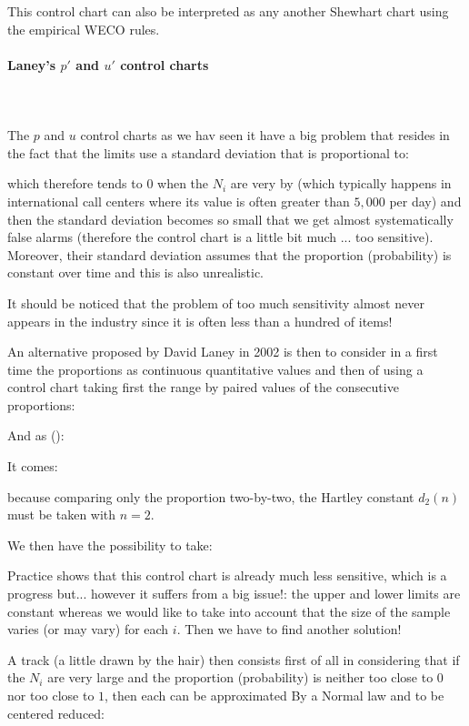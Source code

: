 	This control chart can also be interpreted as any another Shewhart chart using the empirical WECO rules.
	
	\paragraph{Laney's $p'$ and $u'$ control charts}\mbox{}\\\\
	The $p$ and $u$ control charts as we hav seen it have a big problem that resides in the fact that the limits use a standard deviation that is proportional to:
	
	which therefore tends to $0$ when the $N_i$ are very by (which typically happens in international call centers where its value is often greater than $5,000$ per day) and then the standard deviation becomes so small that we get almost systematically false alarms (therefore the control chart is a little bit much ... too sensitive). Moreover, their standard deviation assumes that the proportion (probability) is constant over time and this is also unrealistic.

	It should be noticed that the problem of too much sensitivity almost never appears in the industry since it is often less than a hundred of items!

	An alternative proposed by David Laney in 2002 is then to consider in a first time the proportions as continuous quantitative values and then of using a control chart taking first the range by paired values of the consecutive proportions:
	
	And as ():
	
	It comes:
	
 	because comparing only the proportion two-by-two, the Hartley constant $d_2(n)$ must be taken with $n=2$.

	We then have the possibility to take:
	
	Practice shows that this control chart is already much less sensitive, which is a progress but... however it suffers from a big issue!: the upper and lower limits are constant whereas we would like to take into account that the size of the sample varies (or may vary) for each $i$. Then we have to find another solution!
	
	A track (a little drawn by the hair) then consists first of all in considering that if the $N_i$ are very large and the proportion (probability) is neither too close to $0$ nor too close to $1$, then each can be approximated By a Normal law and to be centered reduced:
	
